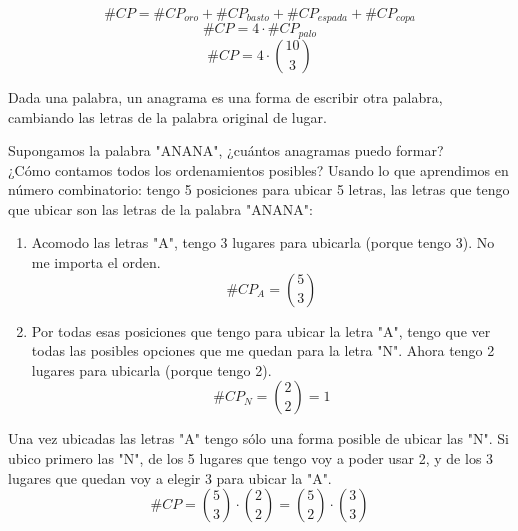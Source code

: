 \documentclass[../main.tex]{subfiles}
\begin{document}
\begin{defexample}
\begin{enumerate}[label=\alph*)]
\begin{equation*}
            \end{equation*}
            \begin{equation*}
                \#CP = \#CP_{oro} + \#CP_{basto} + \#CP_{espada} + \#CP_{copa}
            \end{equation*}
            \begin{equation*}
                \#CP = 4 \cdot \#CP_{palo}
            \end{equation*}
            \begin{equation*}
                \#CP = 4 \cdot \binom{10}{3}
            \end{equation*}
    \end{enumerate}
\end{defexample}

\begin{definition}[Anagramas]
    Dada una palabra, un anagrama es una forma de escribir otra palabra, cambiando las letras de la palabra original de lugar. 
\end{definition}

\begin{defexample}
    Supongamos la palabra "ANANA", ¿cuántos anagramas puedo formar?\\
    ¿Cómo contamos todos los ordenamientos posibles? Usando lo que aprendimos en número combinatorio: tengo 5 posiciones para ubicar 5 letras, las letras que tengo que ubicar son las letras de la palabra "ANANA":
    \begin{enumerate}
        \item Acomodo las letras "A", tengo 3 lugares para ubicarla (porque tengo 3). No me importa el orden.
            \begin{equation}
                \#CP_{A} = \binom{5}{3}
            \end{equation}
        
        \item  Por todas esas posiciones que tengo para ubicar la letra "A", tengo que ver todas las posibles opciones que me quedan para la letra "N". Ahora tengo 2 lugares para ubicarla (porque tengo 2).
            \begin{equation}
                \#CP_{N} = \binom{2}{2} = 1
            \end{equation}
    \end{enumerate}
    Una vez ubicadas las letras "A" tengo sólo una forma posible de ubicar las "N". Si ubico primero las "N", de los 5 lugares que tengo voy a poder usar 2, y de los 3 lugares que quedan voy a elegir 3 para ubicar la "A".
    \begin{equation*}
        \#CP = \binom{5}{3} \cdot \binom{2}{2} = \binom{5}{2} \cdot \binom{3}{3} 
    \end{equation*}
\end{defexample}
\end{document}
